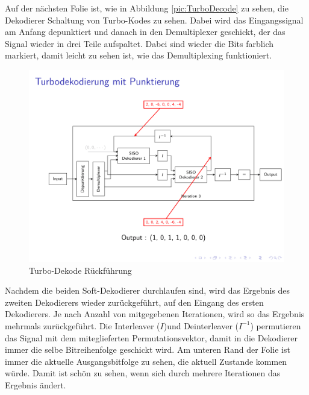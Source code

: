 Auf der nächsten Folie ist, wie in Abbildung \ref{pic:TurboDecode} zu sehen, die Dekodierer Schaltung von Turbo-Kodes zu sehen. Dabei wird das Eingangssignal am Anfang depunktiert und danach in den Demultiplexer geschickt, der das Signal wieder in drei Teile aufspaltet. Dabei sind wieder die Bits farblich markiert, damit leicht zu sehen ist, wie das Demultiplexing funktioniert.

\begin{figure}[!ht]
\centering
\includegraphics[width=\ScaleIfNeeded]{pictures/TurboDecodePunctured3}
\caption{Turbo-Dekode Rückführung}
\label{pic:TurboDecodeBack}
\end{figure}

Nachdem die beiden Soft-Dekodierer durchlaufen sind, wird das Ergebnis des zweiten Dekodierers wieder zurückgeführt, auf den Eingang des ersten Dekodierers. Je nach Anzahl von mitgegebenen Iterationen, wird so das Ergebnis mehrmals zurückgeführt. Die Interleaver ($I$)und Deinterleaver ($I^{-1}$) permutieren das Signal mit dem miteglieferten Permutationsvektor, damit in die Dekodierer immer die selbe Bitreihenfolge geschickt wird. Am unteren Rand der Folie ist immer die aktuelle Ausgangsbitfolge zu sehen, die aktuell Zustande kommen würde. Damit ist schön zu sehen, wenn sich durch mehrere Iterationen das Ergebnis ändert.

